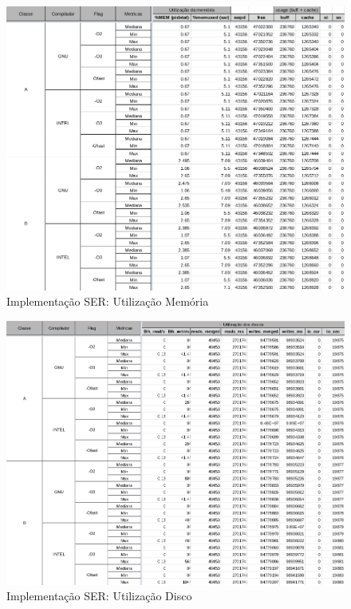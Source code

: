 \documentclass{article}
\begin{document}
\begin{appendices}
\begin{figure}[H]
    \centering
    \includegraphics[width=12cm]{Pictures/FT_r431_SER_MEM.png}
    \caption{Implementação SER: Utilização Memória}
    \label{figure:FT_r431_SER_MEM}
\end{figure}

\begin{figure}[H]
    \centering
    \includegraphics[width=12cm]{Pictures/FT_r431_SER_DISK.png}
    \caption{Implementação SER: Utilização Disco}
    \label{figure:FT_r431_SER_DISK}
\end{figure}


\end{appendices}
\end{document}

